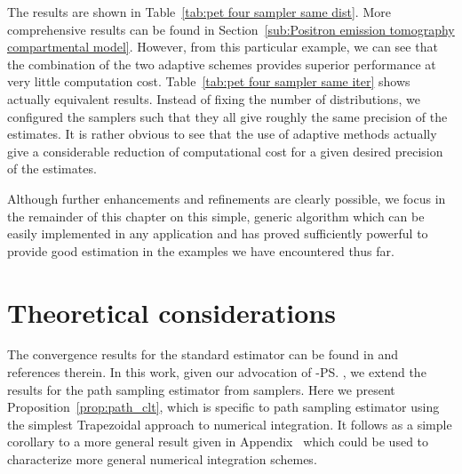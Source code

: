 

The results are shown in Table~\ref{tab:pet four sampler same dist}. More
comprehensive results can be found in Section~\ref{sub:Positron emission
  tomography compartmental model}. However, from this particular example, we
can see that the combination of the two adaptive schemes provides superior
performance at very little computation cost. Table~\ref{tab:pet four sampler
  same iter} shows actually equivalent results. Instead of fixing the number
of distributions, we configured the samplers such that they all give roughly
the same precision of the estimates. It is rather obvious to see that the use
of adaptive methods actually give a considerable reduction of computational
cost for a given desired precision of the estimates.



Although further enhancements and refinements are clearly possible, we focus
in the remainder of this chapter on this simple, generic algorithm which can
be easily implemented in any application and has proved sufficiently powerful
to provide good estimation in the examples we have encountered thus far.

\section{Theoretical considerations}
\label{sec:Theoretical considerations}

The convergence results for the standard estimator can be found in
\cite{DelMoral:2006hc} and references therein. In this work, given our
advocation of \smc[2]-\ps, we extend the results for the path sampling
estimator from \smc samplers. Here we present Proposition~\ref{prop:path_clt},
which is specific to path sampling estimator using the simplest Trapezoidal
approach to numerical integration. It follows as a simple corollary to a more
general result given in Appendix~ which
could be used to characterize more general numerical integration schemes.

